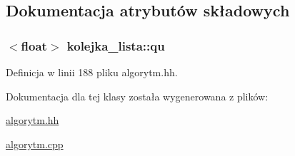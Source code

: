 \subsection{\-Dokumentacja atrybutów składowych}
\hypertarget{classkolejka__lista_a5e378458ccfc86d903b1a71a8ff5bad8}{
\subsubsection[{qu}]{$<$float$>$ {\bf kolejka\-\_\-lista\-::qu}}}\label{classkolejka__lista_a5e378458ccfc86d903b1a71a8ff5bad8}


\-Definicja w linii 188 pliku algorytm.\-hh.



\-Dokumentacja dla tej klasy została wygenerowana z plików\-:\begin{DoxyCompactItemize}
\item 
\hyperlink{algorytm_8hh}{algorytm.\-hh}\item 
\hyperlink{algorytm_8cpp}{algorytm.\-cpp}\end{DoxyCompactItemize}

